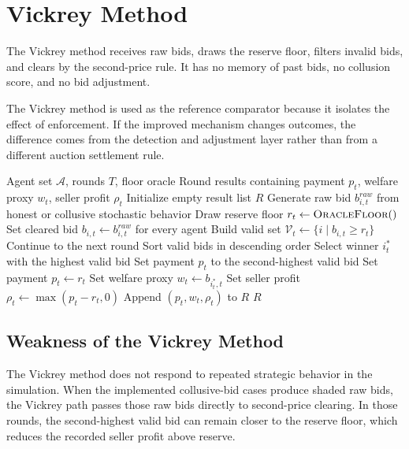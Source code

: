 \documentclass[conference]{IEEEtran}
\begin{document}
\section{Vickrey Method}
The Vickrey method receives raw bids, draws the reserve floor, filters invalid bids, and clears by the second-price rule. It has no memory of past bids, no collusion score, and no bid adjustment.

The Vickrey method is used as the reference comparator because it isolates the effect of enforcement. If the improved mechanism changes outcomes, the difference comes from the detection and adjustment layer rather than from a different auction settlement rule.

\begin{algorithm}[t]
\caption{Vickrey method reserve-constrained second-price auction}
\label{alg:vickrey}
\begin{algorithmic}[1]
\REQUIRE Agent set $\mathcal{A}$, rounds $T$, floor oracle
\ENSURE Round results containing payment $p_t$, welfare proxy $w_t$, seller profit $\rho_t$
\STATE Initialize empty result list $R$
        \STATE Generate raw bid $b^{raw}_{i,t}$ from honest or collusive stochastic behavior
    \ENDFOR
    \STATE Draw reserve floor $r_t \leftarrow \textsc{OracleFloor}()$
    \STATE Set cleared bid $b_{i,t} \leftarrow b^{raw}_{i,t}$ for every agent
    \STATE Build valid set $\mathcal{V}_t \leftarrow \{i \mid b_{i,t} \geq r_t\}$
        \STATE Continue to the next round
    \ENDIF
    \STATE Sort valid bids in descending order
    \STATE Select winner $i_t^\ast$ with the highest valid bid
        \STATE Set payment $p_t$ to the second-highest valid bid
    \ELSE
        \STATE Set payment $p_t \leftarrow r_t$
    \ENDIF
    \STATE Set welfare proxy $w_t \leftarrow b_{i_t^\ast,t}$
    \STATE Set seller profit $\rho_t \leftarrow \max(p_t-r_t,0)$
    \STATE Append $(p_t,w_t,\rho_t)$ to $R$
\ENDFOR
\RETURN $R$
\end{algorithmic}
\end{algorithm}

\subsection{Weakness of the Vickrey Method}
The Vickrey method does not respond to repeated strategic behavior in the simulation. When the implemented collusive-bid cases produce shaded raw bids, the Vickrey path passes those raw bids directly to second-price clearing. In those rounds, the second-highest valid bid can remain closer to the reserve floor, which reduces the recorded seller profit above reserve.
\end{document}
